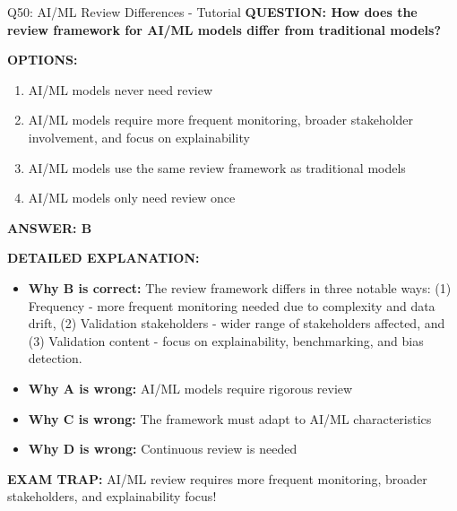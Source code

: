 \documentclass[8pt]{beamer}
\begin{document}
	\begin{frame}{Q50: AI/ML Review Differences - Tutorial}
		\fontsize{6.5}{7.5}\selectfont
		\textbf{QUESTION: How does the review framework for AI/ML models differ from traditional models?}
		
		\vspace{0.1cm}
		\textbf{OPTIONS:}
		\begin{enumerate}
			\item AI/ML models never need review
			\item AI/ML models require more frequent monitoring, broader stakeholder involvement, and focus on explainability
			\item AI/ML models use the same review framework as traditional models
			\item AI/ML models only need review once
		\end{enumerate}
		
		\vspace{0.1cm}
		\textcolor{myblue}{\textbf{ANSWER: B}}
		
		\vspace{0.1cm}
		\textbf{DETAILED EXPLANATION:}
		\begin{itemize}
			\item \textbf{Why B is correct:} The review framework differs in three notable ways: (1) Frequency - more frequent monitoring needed due to complexity and data drift, (2) Validation stakeholders - wider range of stakeholders affected, and (3) Validation content - focus on explainability, benchmarking, and bias detection.
			\item \textbf{Why A is wrong:} AI/ML models require rigorous review
			\item \textbf{Why C is wrong:} The framework must adapt to AI/ML characteristics
			\item \textbf{Why D is wrong:} Continuous review is needed
		\end{itemize}
		
		\textcolor{myred}{\textbf{EXAM TRAP:}} AI/ML review requires \textcolor{myblue}{more frequent monitoring, broader stakeholders, and explainability focus}!
	\end{frame}
	
	
\end{document}
